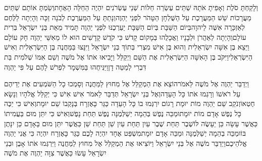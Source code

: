 \documentclass[../main/main.tex]{subfiles}
\begin{document}
\begin{multicols*}{\ncols}
וְלָקַחְתָּ סֹלֶת וְאָפִיתָ אֹתָהּ שְׁתֵּים עֶשְׂרֵה חַלּוֹת שְׁנֵי עֶשְׂרֹנִים יִהְיֶה הַחַלָּה הָאֶחָת\PreVerseSpace{}וְשַׂמְתָּ אוֹתָם שְׁתַּיִם מַעֲרָכוֹת שֵׁשׁ הַמַּעֲרָכֶת עַל הַשֻּׁלְחָן הַטָּהֹר לִפְנֵי יַהְוֶה\PreVerseSpace{}וְנָתַתָּ עַל הַמַּעֲרֶכֶת לְבֹנָה זַכָּה וְהָיְתָה לַלֶּחֶם לְאַזְכָּרָה אִשֶּׁה לַיהוָה\PreVerseSpace{}בְּיוֹם הַשַּׁבָּת בְּיוֹם הַשַּׁבָּת יַעַרְכֶנּוּ לִפְנֵי יַהְוֶה תָּמִיד מֵאֵת בְּנֵי יִשְׂרָאֵל בְּרִית עוֹלָם\PreVerseSpace{}וְהָיְתָה לְאַהֲרֹן וּלְבָנָיו וַאֲכָלֻהוּ בְּמָקוֹם קָדֹשׁ כִּי קֹדֶשׁ קָדָשִׁים הוּא לוֹ מֵאִשֵּׁי יַהְוֶה חָק עוֹלָם \ClosedSection{}וַיֵּצֵא בֶּן אִשָּׁה יִשְׂרְאֵלִית וְהוּא בֶּן אִישׁ מִצְרִי בְּתוֹךְ בְּנֵי יִשְׂרָאֵל וַיִּנָּצוּ בַּמַּחֲנֶה בֶּן הַיִּשְׂרְאֵלִית וְאִישׁ הַיִּשְׂרְאֵלִי\PreVerseSpace{}וַיִּקֹּב בֶּן הָאִשָּׁה הַיִּשְׂרְאֵלִית אֶת הַשֵּׁם וַיְקַלֵּל וַיָּבִיאוּ אֹתוֹ אֶל מֹשֶׁה וְשֵׁם אִמּוֹ שְׁלֹמִית בַּת דִּבְרִי לְמַטֵּה דָן\PreVerseSpace{}וַיַּנִּיחֻהוּ בַּמִּשְׁמָר לִפְרֹשׁ לָהֶם עַל פִּי יַהְוֶה\OpenSection{}\par
{}וַיְדַבֵּר יַהְוֶה אֶל מֹשֶׁה לֵּאמֹר\PreVerseSpace{}הוֹצֵא אֶת הַמְקַלֵּל אֶל מִחוּץ לַמַּחֲנֶה וְסָמְכוּ כָל הַשֹּׁמְעִים אֶת יְדֵיהֶם עַל רֹאשׁוֹ וְרָגְמוּ אֹתוֹ כָּל הָעֵדָה\PreVerseSpace{}וְאֶל בְּנֵי יִשְׂרָאֵל תְּדַבֵּר לֵאמֹר אִישׁ אִישׁ כִּי יְקַלֵּל אֱלֹהָיו וְנָשָׂא חֶטְאוֹ\PreVerseSpace{}וְנֹקֵב שֵׁם יַהְוֶה מוֹת יוּמָת רָגוֹם יִרְגְּמוּ בוֹ כָּל הָעֵדָה כַּגֵּר כָּאֶזְרָח בְּנָקְבוֹ שֵׁם יוּמָת\PreVerseSpace{}וְאִישׁ כִּי יַכֶּה כָּל נֶפֶשׁ אָדָם מוֹת יוּמָת\PreVerseSpace{}וּמַכֵּה נֶפֶשׁ בְּהֵמָה יְשַׁלְּמֶנָּה נֶפֶשׁ תַּחַת נָפֶשׁ\PreVerseSpace{}וְאִישׁ כִּי יִתֵּן מוּם בַּעֲמִיתוֹ כַּאֲשֶׁר עָשָׂה כֵּן יֵעָשֶׂה לּוֹ\PreVerseSpace{}שֶׁבֶר תַּחַת שֶׁבֶר עַיִן תַּחַת עַיִן שֵׁן תַּחַת שֵׁן כַּאֲשֶׁר יִתֵּן מוּם בָּאָדָם כֵּן יִנָּתֶן בּוֹ\PreVerseSpace{}וּמַכֵּה בְהֵמָה יְשַׁלְּמֶנָּה וּמַכֵּה אָדָם יוּמָת\PreVerseSpace{}מִשְׁפַּט אֶחָד יִהְיֶה לָכֶם כַּגֵּר כָּאֶזְרָח יִהְיֶה כִּי אֲנִי יַהְוֶה אֱלֹהֵיכֶם\PreVerseSpace{}וַיְדַבֵּר מֹשֶׁה אֶל בְּנֵי יִשְׂרָאֵל וַיּוֹצִיאוּ אֶת הַמְקַלֵּל אֶל מִחוּץ לַמַּחֲנֶה וַיִּרְגְּמוּ אֹתוֹ אָבֶן וּבְנֵי יִשְׂרָאֵל עָשׂוּ כַּאֲשֶׁר צִוָּה יַהְוֶה אֶת מֹשֶׁה\OpenSection{}\par

\end{multicols*}
\end{document}
